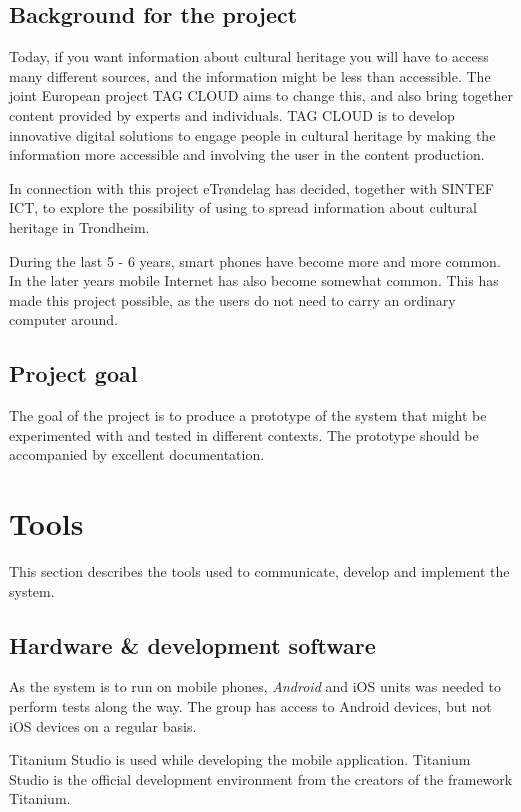 \documentclass[11pt]{book}
\begin{document}
\subsection{Background for the project}
Today, if you want information about cultural heritage you will have to access many different sources, and the information might be less than accessible. The joint European project TAG CLOUD aims to change this, and also bring together content provided by experts and individuals. TAG CLOUD is to develop innovative digital solutions to engage people in cultural heritage by making the information more accessible and involving the user in the content production.

In connection with this project eTrøndelag has decided, together with SINTEF ICT, to explore the possibility of using \shortprojectname to spread information about cultural heritage in Trondheim.

During the last 5 - 6 years, smart phones have become more and more common. In the later years mobile Internet has also become somewhat common. This has made this project possible, as the users do not need to carry an ordinary computer around.

\subsection{Project goal}
The goal of the project is to produce a prototype of the system that might be experimented with and tested in different contexts. The prototype should be accompanied by excellent documentation.

\section{Tools}
This section describes the tools used to communicate, develop and implement the system.

\subsection{Hardware \& development software}
As the system is to run on mobile phones, \emph{Android} and iOS units was needed to perform tests along the way. The group has access to Android devices, but not iOS devices on a regular basis.

Titanium Studio\cite{titaniumStudio} is used while developing the mobile application. Titanium Studio is the official development environment from the creators of the framework Titanium.
\end{document}

